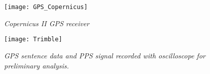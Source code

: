 \begin{figure}
\centering
\texttt{[image: GPS\_Copernicus]}
\caption{\textit{Copernicus II GPS receiver}}
\label{fig:GPS_Copernicus}
\end{figure}

\begin{figure}[H]
\centering
\texttt{[image: Trimble]}
\caption{\textit{GPS sentence data and PPS signal recorded with oscilloscope for preliminary analysis.}}
\label{fig:GPS_PPS}
\end{figure}

